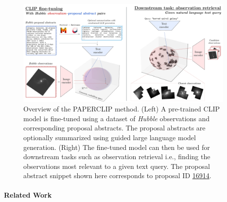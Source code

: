 \documentclass{article} %
\newcommand{\hubble}{\emph{Hubble}\xspace}
\begin{document}
\begin{figure}[!t]
   \centering
   \includegraphics[width=0.97\textwidth]{plots/figure.pdf}
   \caption{Overview of the PAPERCLIP method. (Left) A pre-trained CLIP model is fine-tuned using a dataset of \hubble observations and corresponding proposal abstracts. The proposal abstracts are optionally summarized using guided large language model generation. (Right) The fine-tuned model can then be used for downstream tasks such as observation retrieval i.e., finding the observations most relevant to a given text query. The proposal abstract snippet shown here corresponds to proposal ID \href{https://archive.stsci.edu/proposal_search.php?id=16914&mission=hst}{16914}.}
   \label{fig:overview}
   \end{figure}
   
   
   \paragraph*{Related Work}
\end{document}
